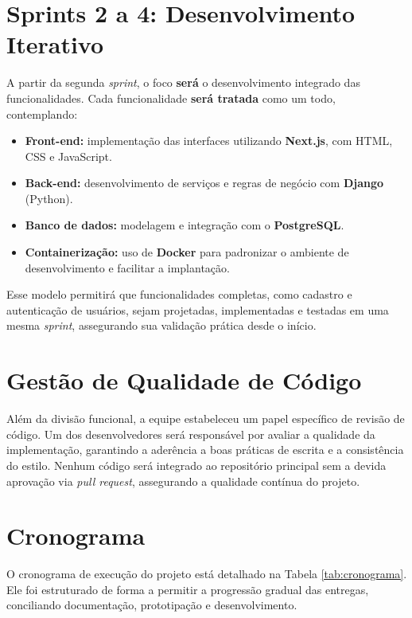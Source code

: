 \section{Sprints 2 a 4: Desenvolvimento Iterativo}

A partir da segunda \textit{sprint}, o foco \textbf{será} o desenvolvimento integrado das funcionalidades. Cada funcionalidade \textbf{será tratada} como um todo, contemplando:

\begin{itemize}
    \item \textbf{Front-end:} implementação das interfaces utilizando \textbf{Next.js}, com HTML, CSS e JavaScript.
    \item \textbf{Back-end:} desenvolvimento de serviços e regras de negócio com \textbf{Django} (Python).
    \item \textbf{Banco de dados:} modelagem e integração com o \textbf{PostgreSQL}.
    \item \textbf{Containerização:} uso de \textbf{Docker} para padronizar o ambiente de desenvolvimento e facilitar a implantação.
\end{itemize}

Esse modelo permitirá que funcionalidades completas, como cadastro e autenticação de usuários, sejam projetadas, implementadas e testadas em uma mesma \textit{sprint}, assegurando sua validação prática desde o início.

\section{Gestão de Qualidade de Código}

Além da divisão funcional, a equipe estabeleceu um papel específico de revisão de código. Um dos desenvolvedores será responsável por avaliar a qualidade da implementação, garantindo a aderência a boas práticas de escrita e a consistência do estilo. Nenhum código será integrado ao repositório principal sem a devida aprovação via \textit{pull request}, assegurando a qualidade contínua do projeto.

\section{Cronograma}

O cronograma de execução do projeto está detalhado na Tabela \ref{tab:cronograma}. Ele foi estruturado de forma a permitir a progressão gradual das entregas, conciliando documentação, prototipação e desenvolvimento.

